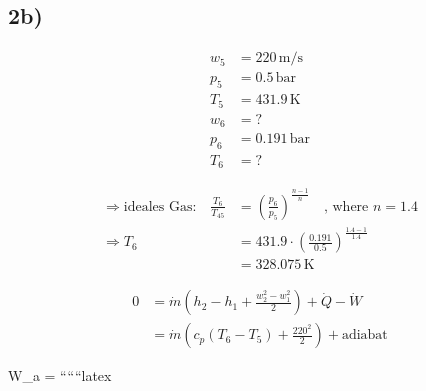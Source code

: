 

\subsection*{2b)}

\begin{align*}
w_5 &= 220 \, \text{m/s} \\
p_5 &= 0.5 \, \text{bar} \\
T_5 &= 431.9 \, \text{K} \\
w_6 &= ? \\
p_6 &= 0.191 \, \text{bar} \\
T_6 &= ? 
\end{align*}

 \Rightarrow {}

\begin{align*}
\Rightarrow \text{ideales Gas:} \quad \frac{T_6}{T_45} &= \left( \frac{p_6}{p_5} \right)^{\frac{n-1}{n}} \quad \text{, where } n = 1.4 \\
\Rightarrow T_6 &= 431.9 \cdot \left( \frac{0.191}{0.5} \right)^{\frac{1.4-1}{1.4}} \\
&= 328.075 \, \text{K}
\end{align*}


\begin{align*}
0 &= \dot{m} \left( h_2 - h_1 + \frac{w_2^2 - w_1^2}{2} \right) + \dot{Q} - \dot{W} \\
&= \dot{m} \left( c_p (T_6 - T_5) + \frac{220^2}{2} \right) + \text{adiabat}
\end{align*}

 \Rightarrow W_a = 
``````latex